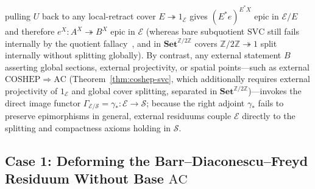 pulling $U$ back to any local-retract cover $E \twoheadrightarrow 1_{\mathcal{E}}$ gives $(E^* e)^{E^* X}$ epic in $\mathcal{E}/E$ and therefore $e^X : A^X \twoheadrightarrow B^X$ epic in $\mathcal{E}$ (whereas bare subquotient $\mathrm{SVC}$ still fails internally by the quotient fallacy~\cite{Blass79}, and in $\mathbf{Set}^{\mathbb{Z}/2\mathbb{Z}}$ covers $\mathbb{Z}/2\mathbb{Z} \twoheadrightarrow 1$ split internally without splitting globally). By contrast, any external statement $B$ asserting global sections, external projectivity, or spatial points---such as external $\mathrm{COSHEP} \Rightarrow \mathrm{AC}$ (Theorem~\ref{thm:coshep-svc}, which additionally requires external projectivity of $1_{\mathcal{E}}$ and global cover splitting, separated in $\mathbf{Set}^{\mathbb{Z}/2\mathbb{Z}}$)---invokes the direct image functor $\Gamma_{\mathcal{E}/\mathcal{S}} = \gamma_* : \mathcal{E} \to \mathcal{S}$; because the right adjoint $\gamma_*$ fails to preserve epimorphisms in general, external residuums couple $\mathcal{E}$ directly to the splitting and compactness axioms holding in $\mathcal{S}$.

\subsection{Case 1: Deforming the Barr--Diaconescu--Freyd Residuum Without Base $\mathrm{AC}$}


